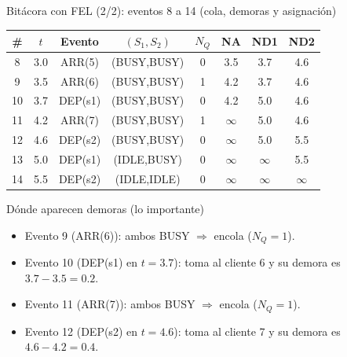 \documentclass[aspectratio=1610, 9pt]{beamer}
\begin{document}
\begin{frame}{Bitácora con FEL (2/2): eventos 8 a 14 (cola, demoras y asignación)}
\small
\setlength{\tabcolsep}{3.6pt}
\renewcommand{\arraystretch}{1.12}
\begin{table}
\centering
\scriptsize
\begin{tabular}{@{}c c c c c c c c@{}}
\toprule
\# & $t$ & Evento & $(S_1,S_2)$ & $N_Q$ & NA & ND1 & ND2\\
\midrule
8  & 3.0 & ARR(5)    & (BUSY,BUSY) & 0 & 3.5 & 3.7 & 4.6\\
9  & 3.5 & ARR(6)    & (BUSY,BUSY) & 1 & 4.2 & 3.7 & 4.6\\
10 & 3.7 & DEP(s1)   & (BUSY,BUSY) & 0 & 4.2 & 5.0 & 4.6\\
11 & 4.2 & ARR(7)    & (BUSY,BUSY) & 1 & $\infty$ & 5.0 & 4.6\\
12 & 4.6 & DEP(s2)   & (BUSY,BUSY) & 0 & $\infty$ & 5.0 & 5.5\\
13 & 5.0 & DEP(s1)   & (IDLE,BUSY) & 0 & $\infty$ & $\infty$ & 5.5\\
14 & 5.5 & DEP(s2)   & (IDLE,IDLE) & 0 & $\infty$ & $\infty$ & $\infty$\\
\bottomrule
\end{tabular}
\end{table}

\vspace{4pt}
\begin{block}{Dónde aparecen demoras (lo importante)}
\begin{itemize}
\item Evento 9 (ARR(6)): ambos BUSY $\Rightarrow$ encola ($N_Q=1$).
\item Evento 10 (DEP(s1) en $t=3.7$): toma al cliente 6 y su demora es $3.7-3.5=0.2$.
\item Evento 11 (ARR(7)): ambos BUSY $\Rightarrow$ encola ($N_Q=1$).
\item Evento 12 (DEP(s2) en $t=4.6$): toma al cliente 7 y su demora es $4.6-4.2=0.4$.
\end{itemize}
\end{block}
\end{frame}
\end{document}
